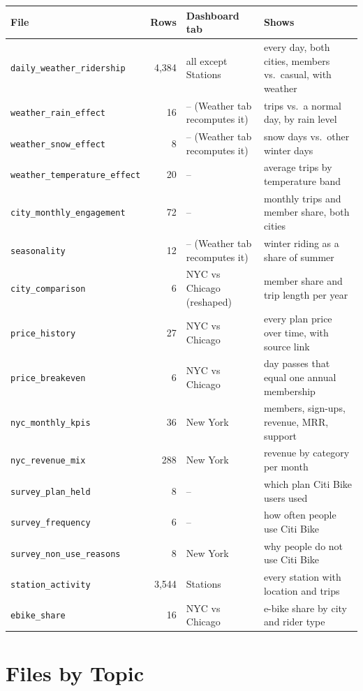 \documentclass[11pt,a4paper]{article}
\newcommand{\f}[1]{\texttt{\small #1}}
\begin{document}
{\small
\begin{tabularx}{\linewidth}{@{}lrlL@{}}
\toprule
File & Rows & Dashboard tab & Shows \\
\midrule
\f{daily\_weather\_ridership} & 4{,}384 & all except Stations & every day, both cities, members vs.\ casual, with weather \\
\f{weather\_rain\_effect} & 16 & -- (Weather tab recomputes it) & trips vs.\ a normal day, by rain level \\
\f{weather\_snow\_effect} & 8 & -- (Weather tab recomputes it) & snow days vs.\ other winter days \\
\f{weather\_temperature\_effect} & 20 & -- & average trips by temperature band \\
\f{city\_monthly\_engagement} & 72 & -- & monthly trips and member share, both cities \\
\f{seasonality} & 12 & -- (Weather tab recomputes it) & winter riding as a share of summer \\
\f{city\_comparison} & 6 & NYC vs Chicago (reshaped) & member share and trip length per year \\
\f{price\_history} & 27 & NYC vs Chicago & every plan price over time, with source link \\
\f{price\_breakeven} & 6 & NYC vs Chicago & day passes that equal one annual membership \\
\f{nyc\_monthly\_kpis} & 36 & New York & members, sign-ups, revenue, MRR, support \\
\f{nyc\_revenue\_mix} & 288 & New York & revenue by category per month \\
\f{survey\_plan\_held} & 8 & -- & which plan Citi Bike users used \\
\f{survey\_frequency} & 6 & -- & how often people use Citi Bike \\
\f{survey\_non\_use\_reasons} & 8 & New York & why people do not use Citi Bike \\
\f{station\_activity} & 3{,}544 & Stations & every station with location and trips \\
\f{ebike\_share} & 16 & NYC vs Chicago & e-bike share by city and rider type \\
\bottomrule
\end{tabularx}}

\section{Files by Topic}
\end{document}
